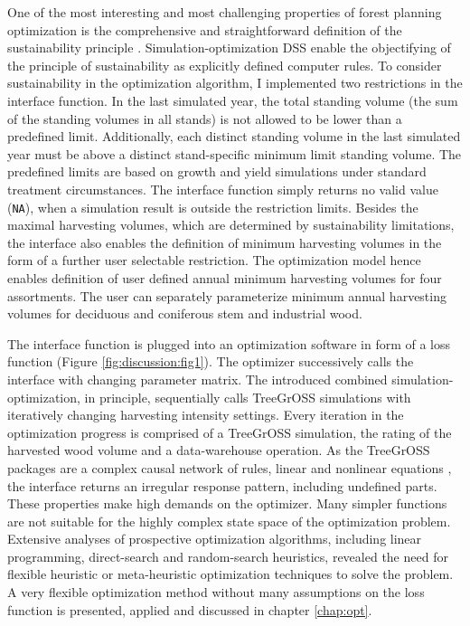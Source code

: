 One of the most interesting and most challenging properties of forest planning optimization is the comprehensive and straightforward definition of the sustainability principle \citep[p. 15]{kangas_2015}. Simulation-optimization DSS enable the objectifying of the principle of sustainability as explicitly defined computer rules. To consider sustainability in the optimization algorithm, I implemented two restrictions in the interface function. In the last simulated year, the total standing volume (the sum of the standing volumes in all stands) is not allowed to be lower than a predefined limit. Additionally, each distinct standing volume in the last simulated year must be above a distinct stand-specific minimum limit standing volume. The predefined limits are based on growth and yield simulations under standard treatment circumstances. The interface function simply returns no valid value ({\tt NA}), when a simulation result is outside the restriction limits. Besides the maximal harvesting volumes, which are determined by sustainability limitations, the interface also enables the definition of minimum harvesting volumes in the form of a further user selectable restriction. The optimization model hence enables definition of user defined annual minimum harvesting volumes for four assortments. The user can separately parameterize minimum annual harvesting volumes for deciduous and coniferous stem and industrial wood.

The interface function is plugged into an optimization software in form of a loss function (Figure \ref{fig:discussion:fig1}). The optimizer successively calls the interface with changing parameter matrix. The introduced combined si\-mu\-la\-tion-op\-ti\-mi\-za\-tion, in principle, sequentially calls TreeGrOSS simulations with iteratively changing harvesting intensity settings. Every iteration in the optimization progress is comprised of a TreeGrOSS simulation, the rating of the harvested wood volume and a data-warehouse operation. As the TreeGrOSS packages are a complex causal network of rules, linear and nonlinear equations \citep[p. 180]{hansen_2014}, the interface returns an irregular response pattern, including undefined parts. These properties make high demands on the optimizer. Many simpler functions are not suitable for the highly complex state space of the optimization problem. Extensive analyses of prospective optimization algorithms, including linear programming, direct-search and random-search heuristics, revealed the need for flexible heuristic or meta-heuristic optimization techniques to solve the problem. A very flexible optimization method without many assumptions on the loss function is presented, applied and discussed in chapter \ref{chap:opt}.

